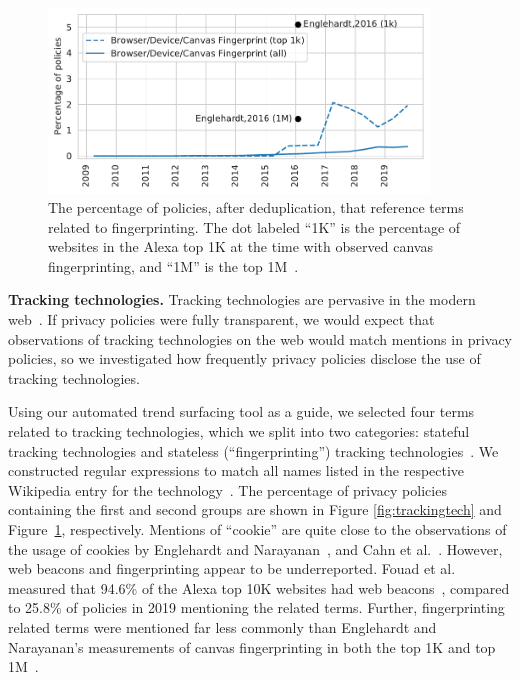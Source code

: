 \begin{figure}[t]
    \centering
    \includegraphics[width=0.9\textwidth]{chapters/privacypolicies/figures/fingerprinting.pdf}
    \caption{The percentage of policies, after deduplication, that reference terms related to fingerprinting. The dot labeled ``1K'' is the percentage of websites in the Alexa top 1K at the time with observed canvas fingerprinting, and ``1M'' is the top 1M~\cite{englehardt2016online}.}
    \label{fig:fingerprinting}
\end{figure}

\textbf{Tracking technologies.} Tracking technologies are pervasive in the modern web~\cite{englehardt2016online}. If privacy policies were fully transparent, we would expect that observations of tracking technologies on the web would match mentions in privacy policies, so we investigated how frequently privacy policies disclose the use of tracking technologies. 

Using our automated trend surfacing tool as a guide, we selected four terms related to tracking technologies, which we split into two categories: stateful tracking technologies and stateless (``fingerprinting'') tracking technologies~\cite{mayer2012}. We constructed regular expressions to match all names listed in the respective Wikipedia entry for the technology~\cite{wikipediaCookie,wikipediaWebBeacon,wikipediaDeviceFingerprint,wikipediaCanvasFingerprint,wikipediaLSO,wikipediaEvercookie}.
The percentage of privacy policies containing the first and second
groups are shown in Figure \ref{fig:trackingtech} and Figure~\ref{fig:fingerprinting}, respectively. Mentions of ``cookie'' are quite close to the observations of the usage of cookies by Englehardt and Narayanan~\cite{englehardt2016online}, and Cahn et al.~\cite{cahn2016empirical}. However, web beacons and fingerprinting appear to be underreported. Fouad et al. measured that 94.6\% of the Alexa top 10K websites had web beacons~\cite{Fouad2020missed}, compared to 25.8\% of policies in 2019 mentioning the related terms. Further, fingerprinting related terms were mentioned far less commonly than Englehardt and Narayanan's measurements of canvas fingerprinting in both the top 1K and top 1M~\cite{englehardt2016online}.

